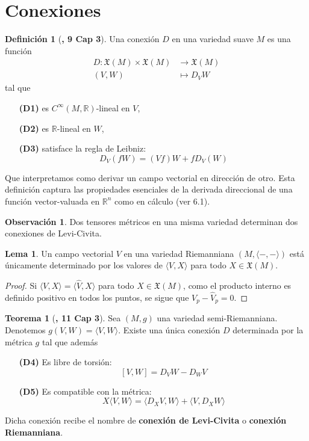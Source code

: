 \documentclass[spanish]{book}
\theoremstyle{definition}
\newtheorem*{defn}{Definición}
\newtheorem*{teo}{Teorema}
\newtheorem*{lema}{Lema}
\newtheorem*{obs}{Observación}
\newcommand{\R}{\mathbb{R}}
\newcommand{\X}{\mathfrak{X}}
\newcommand{\Cinf}{C^\infty}
\begin{document}
	\section{Conexiones}
	\begin{defn}[\cite{ONeill}\textbf{, 9 Cap 3}]
		Una conexión $D$ en una variedad suave $M$ es una función
		\begin{align*}
			D:\X(M)\times\X(M)&\to\X(M)\\
			(V,W)&\mapsto D_VW
		\end{align*}
		tal que
		\begin{enumerate}
			\item[\textbf{(D1)}] es $\Cinf(M,\R)$-lineal en $V$,
			\item[\textbf{(D2)}] es $\R$-lineal en $W$,
			\item[\textbf{(D3)}] satisface la regla de Leibniz:
			\[D_V(fW)=(Vf)W+fD_V(W)\]
		\end{enumerate}
	\end{defn}
	Que interpretamos como derivar un campo vectorial en dirección de otro. Esta definición captura las propiedades esenciales de la derivada direccional de una función vector-valuada en $\R^n$ como en cálculo (ver \cite{Loring-dif} 6.1).
	\begin{obs}
		Dos tensores métricos en una misma variedad determinan dos conexiones de Levi-Civita.
	\end{obs}
	\begin{lema}\label{lem:camp-vect-unico}
		Un campo vectorial $V$ en una variedad Riemanniana $(M,\langle -,-\rangle)$ está únicamente determinado por los valores de $\langle V,X\rangle$ para todo $X\in\X(M)$.
	\end{lema}
	\begin{proof}
		Si $\langle V,X\rangle=\langle \hat{V},X\rangle$ para todo $X\in\X(M)$, como el producto interno es definido positivo en todos los puntos, se sigue que $V_p-\hat{V}_p=0$. 
	\end{proof}
	\begin{teo}[\cite{ONeill}\textbf{, 11 Cap 3}]
		Sea $(M,g)$ una variedad semi-Riemanniana. Denotemos $g(V,W)=\langle V,W\rangle$. Existe una única conexión $D$ determinada por la métrica $g$ tal que además
		\begin{enumerate}
			\item[\textbf{(D4)}] Es libre de torsión:
			\[[V,W]=D_VW-D_WV\]
			\item[\textbf{(D5)}] Es compatible con la métrica:
			\[X\langle V,W\rangle=\langle D_XV,W\rangle+\langle V,D_XW\rangle\]
		\end{enumerate}
		Dicha conexión recibe el nombre de \textbf{conexión de Levi-Civita} o \textbf{conexión Riemanniana}.
	\end{teo}
	
\end{document}
